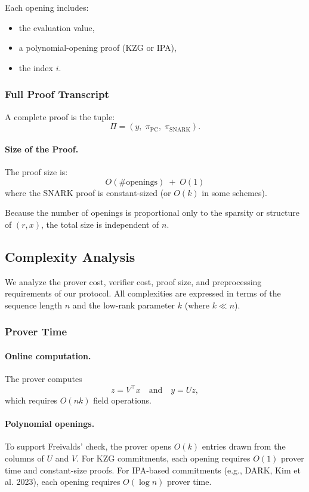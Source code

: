 \documentclass[11pt]{article}
\begin{document}
Each opening includes:
\begin{itemize}
  \item the evaluation value,
  \item a polynomial-opening proof (KZG or IPA),
  \item the index $i$.
\end{itemize}

\subsubsection{Full Proof Transcript}

A complete proof is the tuple:
\[
  \Pi =
  \left(
    y,\;
    \pi_{\mathrm{PC}},\;
    \pi_{\mathrm{SNARK}}
  \right).
\]

\paragraph{Size of the Proof.}
The proof size is:
\[
  O(\#\text{openings}) \;+\; O(1)
\]
where the SNARK proof is constant-sized (or $O(k)$ in some schemes).

Because the number of openings is proportional only to the sparsity or
structure of $(r, x)$, the total size is independent of $n$.
\subsection{Complexity Analysis}

We analyze the prover cost, verifier cost, proof size, and preprocessing
requirements of our protocol.  
All complexities are expressed in terms of the sequence length $n$ and
the low-rank parameter $k$ (where $k \ll n$).

\subsubsection{Prover Time}

\paragraph{Online computation.}
The prover computes
\[
  z = V^\top x \quad \text{and} \quad y = U z,
\]
which requires $O(nk)$ field operations.

\paragraph{Polynomial openings.}
To support Freivalds’ check, the prover opens $O(k)$ entries drawn from
the columns of $U$ and $V$.
For KZG commitments, each opening requires $O(1)$ prover time and
constant-size proofs.
For IPA-based commitments (e.g., DARK, Kim et al. 2023), each opening
requires $O(\log n)$ prover time.
\end{document}
